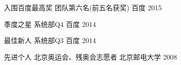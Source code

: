 
\begin{cvhonors}

  \cvhonor
    {入围百度最高奖} %
    {团队第六名(前五名获奖)} %
    {百度} %
    {2015} %

  \cvhonor
    {季度之星} %
    {系统部Q4} %
    {百度} %
    {2014} %

  \cvhonor
    {最佳新人} %
    {系统部Q3} %
    {百度} %
    {2014} %

  \cvhonor
    {先进个人} %
    {北京奥运会、残奥会志愿者} %
    {北京邮电大学} %
    {2008} %

\end{cvhonors}
